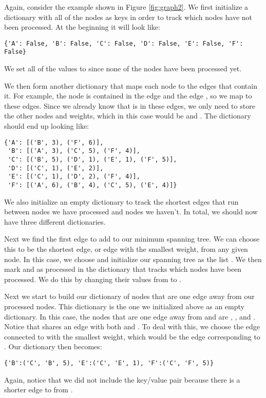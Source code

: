 Again, consider the example shown in Figure \ref{fig:graph2}.
We first initialize a dictionary with all of the nodes as keys in order to track which nodes have not been processed.
At the beginning it will look like:
\begin{lstlisting}
{'A': False, 'B': False, 'C': False, 'D': False, 'E': False, 'F': False}
\end{lstlisting}
We set all of the values to  since none of the nodes have been processed yet.

We then form another dictionary that maps each node to the edges that contain it. For example, the node  is contained in the edge  and the edge , so we map  to these edges. Since we already know that  is in these edges, we only need to store the other nodes and weights, which in this case would be  and .
The dictionary should end up looking like:
\begin{lstlisting}
{'A': [('B', 3), ('F', 6)],
 'B': [('A', 3), ('C', 5), ('F', 4)],
 'C': [('B', 5), ('D', 1), ('E', 1), ('F', 5)],
 'D': [('C', 1), ('E', 2)],
 'E': [('C', 1), ('D', 2), ('F', 4)],
 'F': [('A', 6), ('B', 4), ('C', 5), ('E', 4)]}
\end{lstlisting}
We also initialize an empty dictionary to track the shortest edges that run between nodes we have processed and nodes we haven't. In total, we should now have three different dictionaries.

Next we find the first edge to add to our minimum spanning tree. We can choose this to be the shortest edge, or edge with the smallest weight, from any given node. In this case, we choose  and initialize our spanning tree as the list \li{[('D', 'C', 1)]}.
We then mark  and  as processed in the dictionary that tracks which nodes have been processed. We do this by changing their values from  to .

Next we start to build our dictionary of nodes that are one edge away from our processed nodes. This dictionary is the one we initialized above as an empty dictionary. In this case, the nodes that are one edge away from  and  are , , and . Notice that  shares an edge with both  and . To deal with this, we choose the edge connected to  with the smallest weight, which would be the edge corresponding to . 
Our dictionary then becomes:
\begin{lstlisting}
{'B':('C', 'B', 5), 'E':('C', 'E', 1), 'F':('C', 'F', 5)}
\end{lstlisting}
Again, notice that we did not include the key/value pair  because there is a shorter edge to  from .

